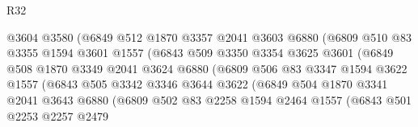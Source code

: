 \begin{lexlean}{R32}
\begin{coremodule}
                            @3604
                            @3580
                            (@6849
                              @512
                              @1870
                              @3357
                              @2041
                              @3603
                              @6880
                              (@6809
                                @510
                                @83
                                @3355
                                @1594
                                @3601
                                @1557
                                (@6843
                                  @509
                                  @3350
                                  @3354
                                  @3625
                                  @3601
                                  (@6849
                                    @508
                                    @1870
                                    @3349
                                    @2041
                                    @3624
                                    @6880
                                    (@6809
                                      @506
                                      @83
                                      @3347
                                      @1594
                                      @3622
                                      @1557
                                      (@6843
                                        @505
                                        @3342
                                        @3346
                                        @3644
                                        @3622
                                        (@6849
                                          @504
                                          @1870
                                          @3341
                                          @2041
                                          @3643
                                          @6880
                                          (@6809
                                            @502
                                            @83
                                            @2258
                                            @1594
                                            @2464
                                            @1557
                                            (@6843
                                              @501
                                              @2253
                                              @2257
                                              @2479

\end{coremodule}
\end{lexlean}
